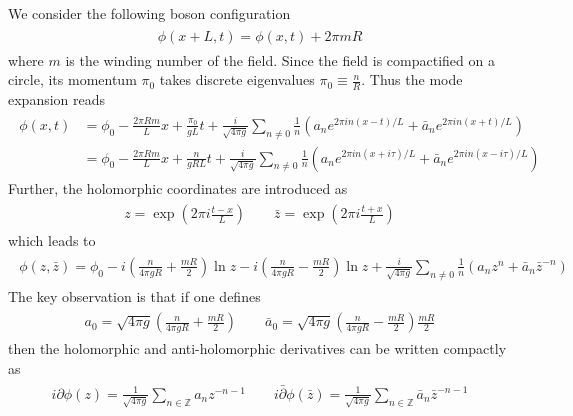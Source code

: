 We consider the following boson configuration
\begin{eqnarray}\begin{aligned}
\phi(x+L,t)=\phi(x,t)+2\pi mR
\end{aligned}\end{eqnarray}
where $m$ is the winding number of the field. Since the field is compactified on a circle, its momentum $\pi_0$ takes discrete eigenvalues $\pi_0\equiv\frac{n}{R}$. Thus the mode expansion reads
\begin{eqnarray}\begin{aligned}
\label{eq:mode_expand_compact}
\phi(x,t)&=\phi_0-\frac{2\pi Rm}{L}x+\frac{\pi_0}{gL}t+\frac{i}{\sqrt{4\pi g}}\sum_{n\neq0}\frac{1}{n}(a_ne^{2\pi i n(x-t)/L}+\bar{a}_{n}e^{2\pi i n(x+t)/L})\\ 
&={\phi}_0-\frac{2\pi Rm}{L}x+\frac{n}{gRL}t+\frac{i}{\sqrt{4\pi g}}\sum_{n\neq0}\frac{1}{n}(a_ne^{2\pi i n(x+i\tau)/L}+\bar{a}_{n}e^{2\pi i n(x-i\tau)/L})
\end{aligned}\end{eqnarray}
Further, the holomorphic coordinates are introduced as
\begin{eqnarray}\begin{aligned}
z=\exp\left(2\pi i\frac{t-x}{L}\right)\qquad\bar{z}=\exp\left(2\pi i\frac{t+x}{L}\right)
\end{aligned}\end{eqnarray}
which leads to 
\begin{eqnarray}\begin{aligned}
\label{eq:phi_in_z}
\phi(z,\bar{z})=\phi_0-i\left(\frac{n}{4\pi gR}+\frac{mR}{2}\right)\ln z-i\left(\frac{n}{4\pi gR}-\frac{mR}{2}\right)\ln z+\frac{i}{\sqrt{4\pi g}}\sum_{n\neq0}\frac{1}{n}(a_nz^{n}+\bar{a}_{n}\bar{z}^{-n})
\end{aligned}\end{eqnarray}
The key observation is that if one defines
\begin{eqnarray}\begin{aligned}
a_0=\sqrt{4\pi g}\left(\frac{n}{4\pi gR}+\frac{mR}{2}\right)\qquad\bar{a}_0=\sqrt{4\pi g}\left(\frac{n}{4\pi gR}-\frac{mR}{2}\right)\frac{mR}{2}
\end{aligned}\end{eqnarray}
then the holomorphic and anti-holomorphic derivatives can be written compactly as
\begin{eqnarray}\begin{aligned}
i\partial\phi(z)=\frac{1}{\sqrt{4\pi g}}\sum_{n\in\mathbb{Z}}a_{n}z^{-n-1}\qquad i\bar{\partial}\phi(\bar{z})=\frac{1}{\sqrt{4\pi g}}\sum_{n\in\mathbb{Z}}\bar{a}_{n}\bar{z}^{-n-1}
\end{aligned}\end{eqnarray}
